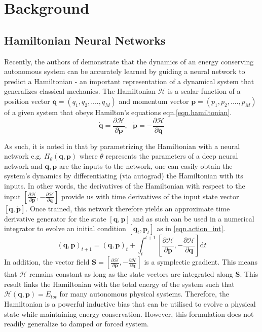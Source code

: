 \documentclass[twoside]{article}
\begin{document}
\section{Background}

\subsection{Hamiltonian Neural Networks}

Recently, the authors of \cite{greydanus_hamiltonian_2019} demonstrate that the dynamics of an energy conserving autonomous system can be accurately learned by guiding a neural network to predict a Hamiltonian - an important representation of a dynamical system that generalizes classical mechanics. The Hamiltonian $\mathcal{H}$ is a scalar function of a position vector $\mathbf{q} = (q_1,q_2,....,q_M)$ and momentum vector $\mathbf{p} = (p_1,p_2,....,p_M)$ of a given system that obeys Hamilton's equations eqn.\ref{eqn.hamiltonian}.
\begin{equation}
\dot{\mathbf{q}}= \frac{\partial \mathcal{H}}{\partial \mathbf{p}}, ~~~
\dot{\mathbf{p}}= -\frac{\partial \mathcal{H}}{\partial \mathbf{q}}
\label{eqn.hamiltonian}
\end{equation}

As such, it is noted in \cite{greydanus_hamiltonian_2019} that by parametrizing the Hamiltonian with a neural network e.g. $H_{\theta}(\mathbf{q},\mathbf{p})$ where $\theta$ represents the parameters of a deep neural network and $\mathbf{q},\mathbf{p}$ are the inputs to the network, one can easily obtain the system's dynamics by differentiating (via autograd) the Hamiltonian with its inputs. In other words, the derivatives of the Hamiltonian with respect to the input $\left [ \frac{\partial \mathcal{H}}{\partial \mathbf{p}},-\frac{\partial \mathcal{H}}{\partial \mathbf{q}} \right ]$ provide us with time derivatives of the input state vector $[\dot{\mathbf{q}},\dot{\mathbf{p}}]$. Once trained, this network therefore yields an approximate time derivative generator for the state $[\mathbf{q},\mathbf{p}]$ and as such can be used in a numerical integrator to evolve an initial condition $[\mathbf{q}_t,\mathbf{p}_t]$ as in \ref{eqn.action_int}.
\begin{equation}
(\mathbf{q},\mathbf{p})_{t+1} = (\mathbf{q},\mathbf{p})_t + \int_t^{t+1} \left [ \frac{\partial \mathcal{H}}{\partial \mathbf{p}},-\frac{\partial \mathcal{H}}{\partial \mathbf{q}} \right ] \mathrm{d}t
\label{eqn.action_int}
\end{equation}
In addition, the vector field $\mathbf{S} = \left [ \frac{\partial \mathcal{H}}{\partial \mathbf{p}},-\frac{\partial \mathcal{H}}{\partial \mathbf{q}} \right ]$ is a symplectic gradient. This means that $\mathcal{H}$ remains constant as long as the state vectors are integrated along $\mathbf{S}$. This result links the Hamiltonian with the total energy of the system such that $\mathcal{H}(\mathbf{q},\mathbf{p}) = E_{tot}$ for many autonomous physical systems. Therefore, the Hamiltonian is a powerful inductive bias that can be utilised to evolve a physical state while maintaining energy conservation. However, this formulation does not readily generalize to damped or forced system.
\end{document}
